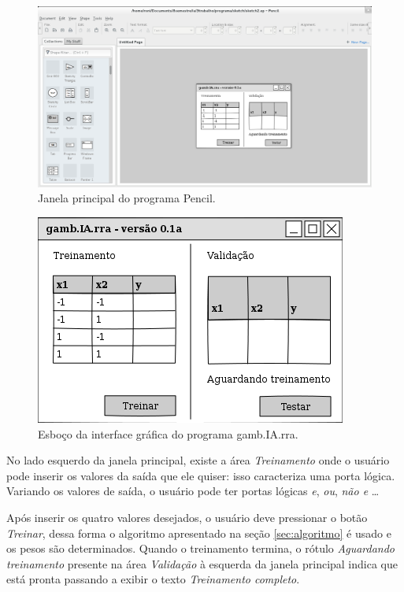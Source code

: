 \documentclass[11pt]{article}
\begin{document}
\begin{figure}[h]
\centering
\includegraphics[scale=0.30]{figuras/pencil}
\caption{Janela principal do programa Pencil.}
\end{figure}

\begin{figure}[h]
\centering
\includegraphics[scale=0.5]{../programa/sketch/figura1}
\caption{Esboço da interface gráfica do programa gamb.IA.rra.}\label{fig:esboco}
\end{figure}

No lado esquerdo da janela principal, existe a área \emph{Treinamento} onde o usuário pode inserir os valores da saída que ele quiser: isso caracteriza uma porta lógica. Variando os valores de saída, o usuário pode ter portas lógicas \emph{e}, \emph{ou}, \emph{não e} \ldots

Após inserir os quatro valores desejados, o usuário deve pressionar o botão \emph{Treinar}, dessa forma o algoritmo apresentado na seção \ref{sec:algoritmo} é usado e os pesos são determinados. Quando o treinamento termina, o rótulo \emph{Aguardando treinamento} presente na área \emph{Validação} à esquerda da janela principal indica que está pronta passando a exibir o texto \emph{Treinamento completo}.
\end{document}
